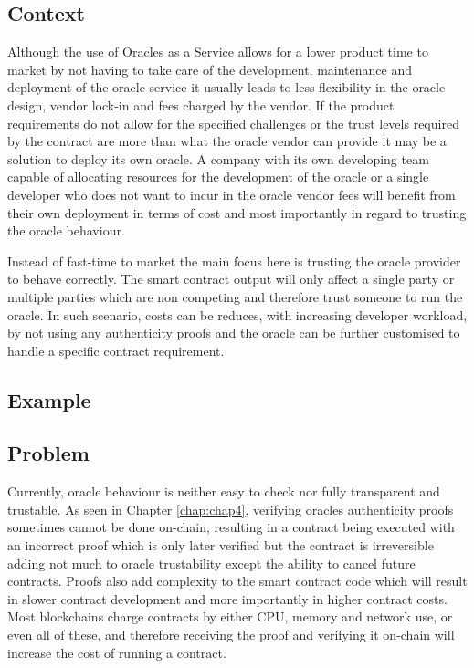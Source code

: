 \subsection{Context}
Although the use of Oracles as a Service allows for a lower product time to market by not having to take care of the development, maintenance and deployment of the oracle service it usually leads to less flexibility in the oracle design, vendor lock-in and fees charged by the vendor. If the product requirements do not allow for the specified challenges or the trust levels required by the contract are more than what the oracle vendor can provide it may be a solution to deploy its own oracle. A company with its own developing team capable of allocating resources for the development of the oracle or a single developer who does not want to incur in the oracle vendor fees will benefit from their own deployment in terms of cost and most importantly in regard to trusting the oracle behaviour.

Instead of fast-time to market the main focus here is trusting the oracle provider to behave correctly. The smart contract output will only affect a single party or multiple parties which are non competing and therefore trust someone to run the oracle. In such scenario, costs can be reduces, with increasing developer workload, by not using any authenticity proofs and the oracle can be further customised to handle a specific contract requirement.

\subsection{Example}


\subsection{Problem}
Currently, oracle behaviour is neither easy to check nor fully transparent and trustable. As seen in Chapter \ref{chap:chap4}, verifying oracles authenticity proofs sometimes cannot be done on-chain, resulting in a contract being executed with an incorrect proof which is only later verified but the contract is irreversible adding not much to oracle trustability except the ability to cancel future contracts. Proofs also add complexity to the smart contract code which will result in slower contract development and more importantly in higher contract costs. Most blockchains charge contracts by either CPU, memory and network use, or even all of these, and therefore receiving the proof and verifying it on-chain will increase the cost of running a contract.

